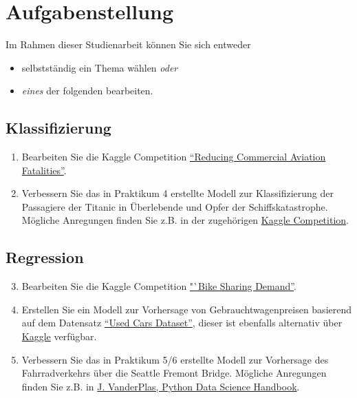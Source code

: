 \documentclass[11pt,a4paper]{article}
\begin{document}
\header[Studienarbeit]

\section*{Aufgabenstellung}
Im Rahmen dieser Studienarbeit können Sie sich entweder 
\begin{itemize}
	\item selbstständig ein Thema wählen \emph{oder}
	\item \emph{eines} der folgenden bearbeiten.
\end{itemize}

\subsection*{Klassifizierung}
	\begin{enumerate}
		\item Bearbeiten Sie die Kaggle Competition \href{https://www.kaggle.com/c/reducing-commercial-aviation-fatalities}{"`Reducing Commercial Aviation Fatalities"'}.
		\item Verbessern Sie das in Praktikum 4 erstellte Modell zur Klassifizierung der Passagiere der Titanic in Überlebende und Opfer der Schiffskatastrophe. Mögliche Anregungen finden Sie z.B. in der zugehörigen \href{https://www.kaggle.com/c/titanic}{Kaggle Competition}.
	\end{enumerate}
\subsection*{Regression}
	\begin{enumerate}
		\setcounter{enumi}{2}
		\item Bearbeiten Sie die Kaggle Competition \href{https://www.kaggle.com/c/bike-sharing-demand}{"`Bike Sharing Demand''}.
		\item Erstellen Sie ein Modell zur Vorhersage von Gebrauchtwagenpreisen basierend auf dem Datensatz \href{https://syncandshare.lrz.de/dl/fiAzFNmK5f5d9ftPZHeaC2d/vehicles.csv.zip}{"`Used Cars Dataset"'}, dieser ist ebenfalls alternativ über \href{https://www.kaggle.com/austinreese/craigslist-carstrucks-data}{Kaggle} verfügbar.
		\item Verbessern Sie das in Praktikum 5/6 erstellte Modell zur Vorhersage des Fahrradverkehrs über die Seattle Fremont Bridge. Mögliche Anregungen finden Sie z.B. in \href{https://jakevdp.github.io/PythonDataScienceHandbook/05.06-linear-regression.html}{J. VanderPlas, Python Data Science Handbook}.
	\end{enumerate}
\end{document}
